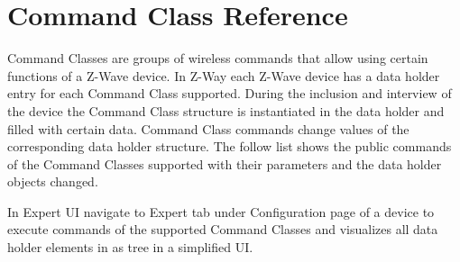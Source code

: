 \chapter{Command Class Reference}
\label{ccs}


Command Classes are groups of wireless commands that allow using certain functions of a Z-Wave device.  
In Z-Way each Z-Wave device has a data holder entry for each Command Class supported. During the inclusion 
and interview of the device the Command Class structure is instantiated in the data holder and filled with 
certain data. Command Class commands change values of the corresponding data holder structure. The follow 
list shows the public commands of the Command Classes supported with their parameters and the data holder 
objects changed.

In Expert UI navigate to Expert tab under Configuration page of a device to execute commands of the supported Command Classes and visualizes all data holder elements in as tree in a simplified UI.
